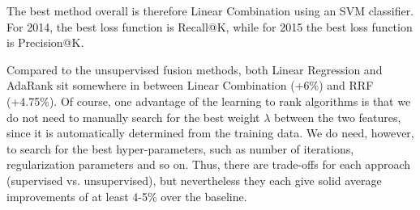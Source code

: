 \begin{table}[h!]
\centering
\caption{Comparison between best fusion methods.}
\label{fusion-comp}
\end{table}

The best method overall is therefore Linear Combination using an SVM classifier. For 2014, the best loss function
is Recall@K, while for 2015 the best loss function is Precision@K.

Compared to the unsupervised fusion methods, both Linear Regression and AdaRank sit somewhere in between
Linear Combination (+6\%) and RRF (+4.75\%). Of course, one advantage of the learning to rank algorithms
is that we do not need to manually search for the best weight $\lambda$ between the two features, 
since it is automatically determined
from the training data. 
We do need, however, to search for the best hyper-parameters, such as number of iterations, regularization
parameters and so on. Thus, there are trade-offs for each approach (supervised vs. unsupervised), 
but nevertheless they each give solid average improvements of at least 4-5\% over the baseline.

